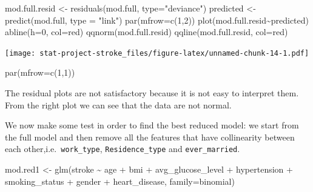 \documentclass[
]{article}
\newenvironment{Shaded}{\begin{snugshade}}{\end{snugshade}}
\newcommand{\AttributeTok}[1]{\textcolor[rgb]{0.77,0.63,0.00}{#1}}
\newcommand{\DecValTok}[1]{\textcolor[rgb]{0.00,0.00,0.81}{#1}}
\newcommand{\FunctionTok}[1]{\textcolor[rgb]{0.00,0.00,0.00}{#1}}
\newcommand{\NormalTok}[1]{#1}
\newcommand{\OtherTok}[1]{\textcolor[rgb]{0.56,0.35,0.01}{#1}}
\newcommand{\SpecialCharTok}[1]{\textcolor[rgb]{0.00,0.00,0.00}{#1}}
\newcommand{\StringTok}[1]{\textcolor[rgb]{0.31,0.60,0.02}{#1}}
\begin{document}
\begin{Shaded}
\begin{Highlighting}[]
\NormalTok{mod.full.resid }\OtherTok{\textless{}{-}} \FunctionTok{residuals}\NormalTok{(mod.full, }\AttributeTok{type=}\StringTok{"deviance"}\NormalTok{) }
\NormalTok{predicted }\OtherTok{\textless{}{-}} \FunctionTok{predict}\NormalTok{(mod.full, }\AttributeTok{type =} \StringTok{"link"}\NormalTok{)}
\FunctionTok{par}\NormalTok{(}\AttributeTok{mfrow=}\FunctionTok{c}\NormalTok{(}\DecValTok{1}\NormalTok{,}\DecValTok{2}\NormalTok{))}
\FunctionTok{plot}\NormalTok{(mod.full.resid}\SpecialCharTok{\textasciitilde{}}\NormalTok{predicted)}
\FunctionTok{abline}\NormalTok{(}\AttributeTok{h=}\DecValTok{0}\NormalTok{, }\AttributeTok{col=}\StringTok{\textquotesingle{}red\textquotesingle{}}\NormalTok{)}
\FunctionTok{qqnorm}\NormalTok{(mod.full.resid)}
\FunctionTok{qqline}\NormalTok{(mod.full.resid, }\AttributeTok{col=}\StringTok{\textquotesingle{}red\textquotesingle{}}\NormalTok{)}
\end{Highlighting}
\end{Shaded}

\texttt{[image: stat-project-stroke\_files/figure-latex/unnamed-chunk-14-1.pdf]}

\begin{Shaded}
\begin{Highlighting}[]
\FunctionTok{par}\NormalTok{(}\AttributeTok{mfrow=}\FunctionTok{c}\NormalTok{(}\DecValTok{1}\NormalTok{,}\DecValTok{1}\NormalTok{))}
\end{Highlighting}
\end{Shaded}

The residual plots are not satisfactory because it is not easy to
interpret them. From the right plot we can see that the data are not
normal.

We now make some test in order to find the best reduced model: we start
from the full model and then remove all the features that have
collinearity between each other,i.e.~\texttt{work\_type},
\texttt{Residence\_type} and \texttt{ever\_married}.

\begin{Shaded}
\begin{Highlighting}[]
\NormalTok{mod.red1 }\OtherTok{\textless{}{-}} \FunctionTok{glm}\NormalTok{(stroke }\SpecialCharTok{\textasciitilde{}}\NormalTok{ age }\SpecialCharTok{+}\NormalTok{ bmi }\SpecialCharTok{+}\NormalTok{ avg\_glucose\_level }\SpecialCharTok{+}\NormalTok{ hypertension }\SpecialCharTok{+} 
\NormalTok{                  smoking\_status }\SpecialCharTok{+}\NormalTok{ gender }\SpecialCharTok{+}\NormalTok{ heart\_disease, }\AttributeTok{family=}\NormalTok{binomial)}
\end{Highlighting}
\end{Shaded}
\end{document}
